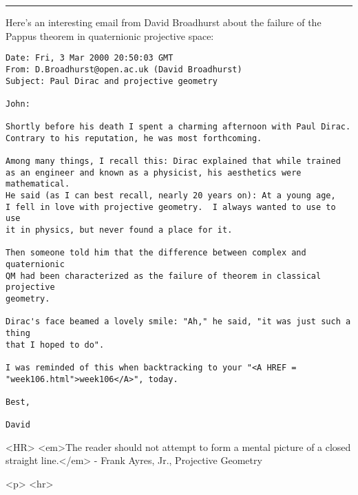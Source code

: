 \par\noindent\rule{\textwidth}{0.4pt}

Here's an interesting email from David Broadhurst 
about the failure of the Pappus theorem in quaternionic projective
space:


\begin{verbatim}
Date: Fri, 3 Mar 2000 20:50:03 GMT
From: D.Broadhurst@open.ac.uk (David Broadhurst)
Subject: Paul Dirac and projective geometry

John:

Shortly before his death I spent a charming afternoon with Paul Dirac.
Contrary to his reputation, he was most forthcoming.

Among many things, I recall this: Dirac explained that while trained
as an engineer and known as a physicist, his aesthetics were mathematical.
He said (as I can best recall, nearly 20 years on): At a young age,
I fell in love with projective geometry.  I always wanted to use to use 
it in physics, but never found a place for it.

Then someone told him that the difference between complex and quaternionic
QM had been characterized as the failure of theorem in classical projective 
geometry.

Dirac's face beamed a lovely smile: "Ah," he said, "it was just such a thing
that I hoped to do".

I was reminded of this when backtracking to your "<A HREF = "week106.html">week106</A>", today.

Best,

David
\end{verbatim}
    


 <HR>
<em>The reader should not attempt to form a mental picture of a closed
straight line.</em> - Frank Ayres, Jr., Projective Geometry



<p> <hr>



